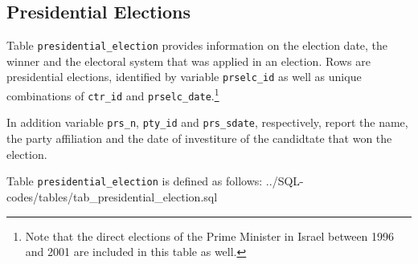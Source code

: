 \subsection{Presidential Elections}\label{subsec_tab_presidential_election}

Table \texttt{presidential\_election} provides information on the election date, the winner and the electoral system that was applied in an election. 
Rows are presidential elections, identified by variable \texttt{prselc\_id} as well as unique combinations of \texttt{ctr\_id} and \texttt{prselc\_date}.\footnote{Note that the direct elections of the Prime Minister in Israel between 1996 and 2001 are included in this table as well.}

In addition variable \texttt{prs\_n}, \texttt{pty\_id} and \texttt{prs\_sdate}, respectively, report the name, the party affiliation and the date of investiture of the candidtate that won the election.

Table \texttt{presidential\_election} is defined as follows: 
%
{../SQL-codes/tables/tab_presidential_election.sql}

